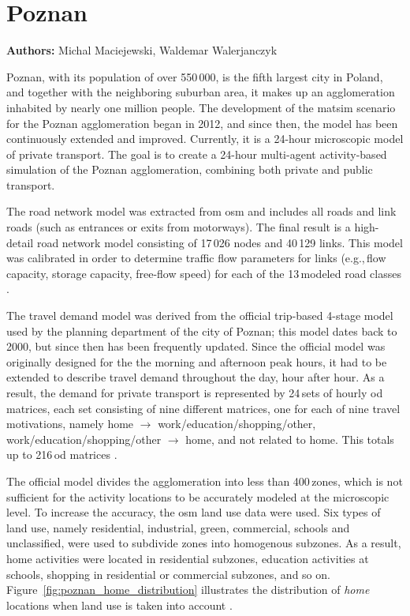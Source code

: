 \section{Poznan}
\label{sec:poznan}
\hfill \textbf{Authors:} Michal Maciejewski, Waldemar Walerjanczyk

Poznan, with its population of over 550\,000, is the fifth largest city in Poland, and together with the neighboring suburban area, it makes up an agglomeration inhabited by nearly one million people. The development of the \gls{matsim} scenario for the Poznan agglomeration began in 2012, and since then, the model has been continuously extended and improved. Currently, it is a 24-hour microscopic model of private transport. The goal is to create a 24-hour multi-agent activity-based simulation of the Poznan agglomeration, combining both private and public transport.

The road network model was extracted from \gls{osm} and includes all roads and link roads (such as entrances or exits from motorways). The final result is a high-detail road network model consisting of 17\,026 nodes and 40\,129 links. This model was calibrated in order to determine traffic flow parameters for links (e.g.,\,flow capacity, storage capacity, free-flow speed) for each of the 13\,modeled road classes \citep{PiatkowskiMaciejewski2012osmNetwork}.

The travel demand model was derived from the official trip-based 4-stage model used by the planning department of the city of Poznan; this model dates back to 2000, but since then has been frequently updated. Since the official model was originally designed for the the morning and afternoon peak hours, it had to be extended to describe travel demand throughout the day, hour after hour. As a result, the demand for private transport is represented by 24\,sets of hourly \gls{od} matrices, each set consisting of nine different matrices, one for each of nine travel motivations, namely home $\rightarrow$ work/education/shopping/other, work/education/shopping/other $\rightarrow$ home, and not related to home. This totals up to 216\,\gls{od} matrices \citep{PiatkowskiEtAl2013Poznan24hSimulation, MaciejewskiEtAl2014MikroMakro}.

The official model divides the agglomeration into less than 400\,zones, which is not sufficient for the activity locations to be accurately modeled at the microscopic level. To increase the accuracy, the \gls{osm} land use data were used. Six types of land use, namely residential, industrial, green, commercial, schools and unclassified, were used to subdivide zones into homogenous subzones. As a result, home activities were located in residential subzones, education activities at schools, shopping in residential or commercial subzones, and so on. Figure~\ref{fig:poznan_home_distribution} illustrates the distribution of \emph{home} locations when land use is taken into account \cite{PiatkowskiMaciejewski2013LandUse}.


